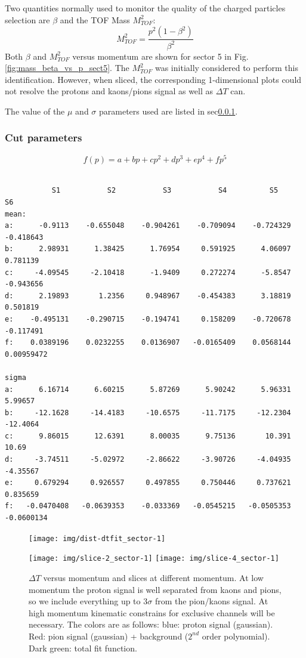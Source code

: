 Two quantities normally used to monitor the quality of the charged particles
selection are $\beta$ and the TOF Mass $M_{TOF}^2$:
$$
 M_{TOF}^2 = \frac{p^2(1-\beta^2)}{\beta^2}
$$
Both $\beta$ and $M_{TOF}^2$ versus momentum are shown for sector 5 in 
Fig.\ref{fig:mass_beta_vs_p_sect5}. The $M_{TOF}^2$ was initially considered
to perform this identification. However, when sliced, the corresponding
1-dimensional plots could not resolve the protons and kaons/pions signal 
as well as $\Delta T$ can.

The value of the $\mu$ and $\sigma$ parameters used are listed in sec\ref{sec:dtp_parameters}.




\subsubsection{Cut parameters}\label{sec:dtp_parameters}
$$
f(p) = a + bp + cp^2 + dp^3 + ep^4 + fp^5
$$
\begin{verbatim}

           S1           S2           S3           S4          S5            S6
mean:
a:      -0.9113    -0.655048    -0.904261    -0.709094    -0.724329    -0.418643
b:      2.98931      1.38425      1.76954     0.591925      4.06097     0.781139
c:     -4.09545     -2.10418      -1.9409     0.272274      -5.8547    -0.943656
d:      2.19893       1.2356     0.948967    -0.454383      3.18819     0.501819
e:    -0.495131    -0.290715    -0.194741     0.158209    -0.720678    -0.117491
f:    0.0389196    0.0232255    0.0136907   -0.0165409    0.0568144   0.00959472

sigma 
a:      6.16714      6.60215      5.87269      5.90242      5.96331      5.99657
b:     -12.1628     -14.4183     -10.6575     -11.7175     -12.2304     -12.4064
c:      9.86015      12.6391      8.00035      9.75136       10.391        10.69
d:     -3.74511     -5.02972     -2.86622     -3.90726     -4.04935     -4.35567
e:     0.679294     0.926557     0.497855     0.750446     0.737621     0.835659
f:   -0.0470408   -0.0639353    -0.033369   -0.0545215   -0.0505353   -0.0600134

\end{verbatim}

\clearpage\newpage

\begin{figure}[ht]
  \centering
		\texttt{[image: img/dist-dtfit\_sector-1]}
		
		\texttt{[image: img/slice-2\_sector-1]}
		\texttt{[image: img/slice-4\_sector-1]}
		
		\caption{$\Delta T$ versus momentum and slices at different momentum.
					At low momentum the proton signal is well separated
					from kaons and pions, so we include everything up to
					$3\sigma$ from the pion/kaons signal. At high momentum 
					kinematic constrains for exclusive channels will be necessary.
					The colors are as follows: blue: proton signal (gaussian).
					Red: pion signal (gaussian) + background ($2^{nd}$ order 
					polynomial). Dark green: total fit function.}
 		\label{fig:dt_vs_mom}
\end{figure}

